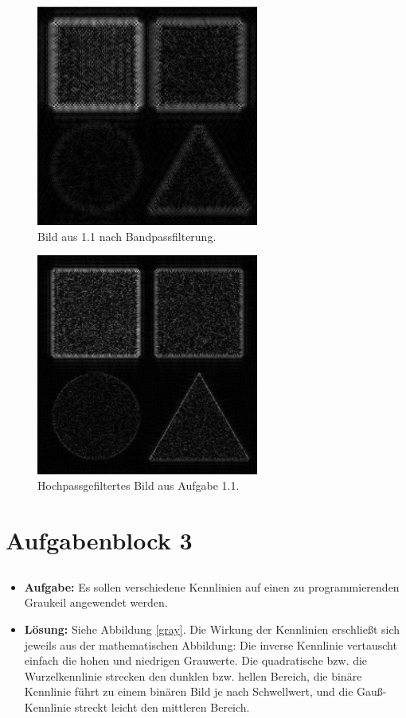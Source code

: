 \documentclass[12pt, a4paper, twoside]{report}
\begin{document}
\begin{figure}[h]
\centering
\includegraphics[width=0.65\textwidth]{../bilder/bandpass.png}
\caption{Bild aus 1.1 nach Bandpassfilterung.}
\label{band}
\end{figure}

\begin{figure}[h]
\centering
\includegraphics[width=0.65\textwidth]{../bilder/hochpass.png}
\caption{Hochpassgefiltertes Bild aus Aufgabe 1.1.}
\label{hoch}
\end{figure}

\chapter{Aufgabenblock 3}

\section{}
\begin{itemize}
\item \textbf{Aufgabe:} Es sollen verschiedene Kennlinien auf einen zu programmierenden Graukeil angewendet werden.
\item \textbf{Lösung:} Siehe Abbildung \ref{gray}. Die Wirkung der Kennlinien erschließt sich jeweils aus der mathematischen Abbildung: Die inverse Kennlinie vertauscht einfach die hohen und niedrigen Grauwerte. Die quadratische bzw. die Wurzelkennlinie strecken den dunklen bzw. hellen Bereich, die binäre Kennlinie führt zu einem binären Bild je nach Schwellwert, und die Gauß-Kennlinie streckt leicht den mittleren Bereich.
\end{itemize}
\end{document}
